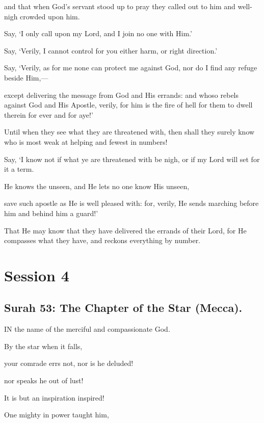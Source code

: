 \documentclass[fontsize=14pt, letterpaper, notitlepage, openany, DIV=12]{scrbook} %
\begin{document}
\noindent[72:19]
and that when God's servant stood up to pray they called out to him and well-nigh
crowded upon him.

\noindent[72:20]
Say, `I only call upon my Lord, and I join no one with Him.'

\noindent[72:21]
Say, `Verily, I cannot control for you either harm, or right direction.'

\noindent[72:22]
Say, `Verily, as for me none can protect me against God, nor do I find any refuge beside
Him,---

\noindent[72:23]
except delivering the message from God and His errands: and whoso rebels against God
and His Apostle, verily, for him is the fire of hell for them to dwell therein for ever and for aye!'

\noindent[72:24]
Until when they see what they are threatened with, then shall they surely know who is
most weak at helping and fewest in numbers!

\noindent[72:25]
Say, `I know not if what ye are threatened with be nigh, or if my Lord will set for it a
term.

\noindent[72:26]
He knows the unseen, and He lets no one know His unseen,

\noindent[72:27]
save such apostle as He is well pleased with: for, verily, He sends marching before him
and behind him a guard!'

\noindent[72:28]
That He may know that they have delivered the errands of their Lord, for He compasses
what they have, and reckons everything by number.

\clearpage
\chapter{Session 4}


\section{Surah 53: The Chapter of the Star (Mecca).}


IN the name of the merciful and compassionate God.

\noindent[53:1]
By the star when it falls,

\noindent[53:2]
your comrade errs not, nor is he deluded!

\noindent[53:3]
nor speaks he out of lust!

\noindent[53:4]
It is but an inspiration inspired!

\noindent[53:5]
One mighty in power taught him,
\end{document}
